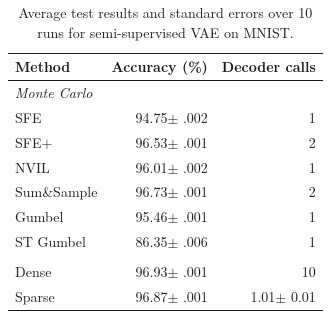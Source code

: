 \begin{table}[t]
    \centering
    \tlfstyle
    \begin{tabular}{lrr}
        \toprule
        Method &
        Accuracy (\%)
               & Decoder calls                                                \\
        \midrule

        \multicolumn{3}{l}{\emph{Monte Carlo}}                                \\
        SFE
               & 94.75{\color{gray}$\pm$ .002} & 1                            \\
        SFE$+$
               & 96.53{\color{gray}$\pm$ .001} & 2                            \\
        NVIL
               & 96.01{\color{gray}$\pm$ .002} & 1                            \\
        Sum\&Sample
               & 96.73{\color{gray}$\pm$ .001} & 2                            \\
        Gumbel
               & 95.46{\color{gray}$\pm$ .001} & 1                            \\
        ST Gumbel
               & 86.35{\color{gray}$\pm$ .006} & 1                            \\
        \spacerule
        \multicolumn{3}{l}{\emph{Marginalization}}                            \\
        Dense
               & 96.93{\color{gray}$\pm$ .001} & 10                           \\
        Sparse {\small \color{gray}{(proposed)}}
               & 96.87{\color{gray}$\pm$ .001} & 1.01{\color{gray}$\pm$ 0.01} \\
        \bottomrule
    \end{tabular}
    \caption[Test set results for semi-supervised VAE on MNIST.]{\label{tab:ssvaeelbo}
        Average test results and standard errors over 10 runs for semi-supervised VAE on MNIST.}
\end{table}

